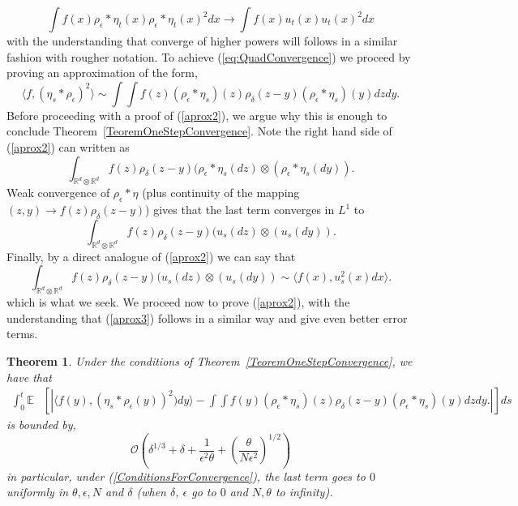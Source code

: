 \documentclass[12pt]{article}
\newtheorem{theorem}{Theorem}[section]
\newcommand{\IR}{\mathbb R}
\begin{document}
\begin{equation} \label{eq:QuadConvergence} \int f(x) \rho_\epsilon * \eta_t(x) \rho_\epsilon * \eta_t(x)^2 dx \rightarrow \int f(x) u_t(x) u_t(x)^2 dx \end{equation}
with the understanding that converge of higher powers will follows in a similar fashion with rougher notation. To achieve (\ref{eq:QuadConvergence}) we proceed by proving an approximation of the form,
\begin{equation}
\label{aprox2}
\langle f, (\eta_s * \rho_\epsilon)^2 \rangle \sim \int \int f(z) (\rho_\epsilon * \eta_s)(z) \rho_\delta (z-y) (\rho_\epsilon * \eta_s)(y) dz dy.
\end{equation}
Before proceeding with a proof of (\ref{aprox2}), we argue why this is enough to conclude Theorem~\ref{TeoremOneStepConvergence}. Note the right hand side of (\ref{aprox2}) can written as
\[ \int_{\IR^{d} \otimes \IR^d} f(z) \rho_\delta(z-y) (\rho_\epsilon * \eta_s(dz) \otimes (\rho_\epsilon * \eta_s(dy)). \]
Weak convergence of $\rho_\epsilon * \eta$ (plus continuity of the mapping $(z,y) \rightarrow f(z) \rho_\delta(z-y)$) gives that the last term converges in $L^1$ to
\[ \int_{\IR^{d} \otimes \IR^d} f(z) \rho_\delta(z-y) (u_s(dz) \otimes (u_s(dy)). \]
Finally, by a direct analogue of (\ref{aprox2}) we can say that
\begin{equation} \int_{\IR^{d} \otimes \IR^d} f(z) \rho_\delta(z-y) (u_s(dz) \otimes (u_s(dy)) \sim \langle f(x), u_s^2(x) dx \rangle. \label{aprox3} \end{equation}
which is what we seek. We proceed now to prove (\ref{aprox2}), with the understanding that (\ref{aprox3}) follows in a similar way and give even better error terms.
\begin{theorem}
Under the conditions of Theorem~\ref{TeoremOneStepConvergence}, we have that
\begin{align*}
\int_0^t \mathbb{E}&\left[\left| \langle f(y), (\eta_s * \rho_\epsilon(y))^2) dy\rangle - \int \int f(y) (\rho_\epsilon * \eta_s)(z) \rho_\delta (z-y) (\rho_\epsilon * \eta_s)(y) dz dy. \right|\right] ds
\end{align*}
is bounded by,
\[  \mathcal{O}\left(\delta^{1/3} + \delta +  \frac{1}{\epsilon^2 \theta} + \left( \frac{\theta}{N \epsilon^2}\right)^{1/2} \right)  \]
in particular, under (\ref{ConditionsForConvergence}), the last term goes to $0$ uniformly in $\theta,\epsilon,N$ and $\delta$ (when $\delta$, $\epsilon$ go to $0$ and $N,\theta$ to infinity).
\end{theorem}
\end{document}
